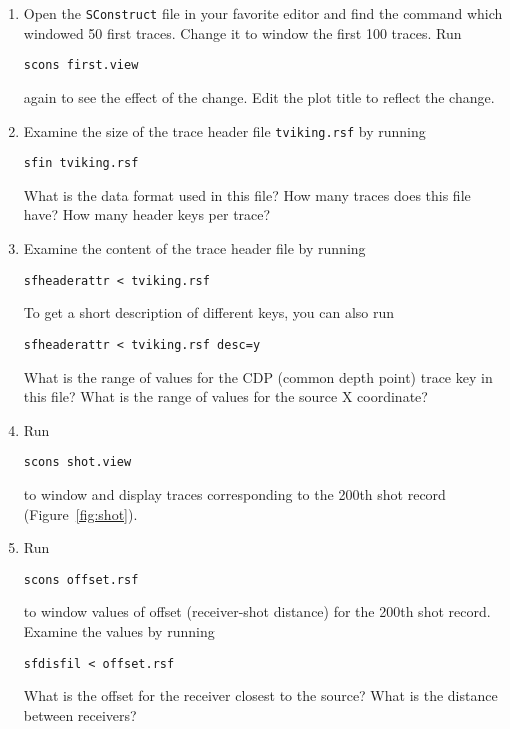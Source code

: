 \begin{enumerate}

\answer{

}

\item Open the \texttt{SConstruct} file in your favorite editor and find the command which windowed 50 first traces. Change it to window the first 100 traces. Run
\begin{verbatim}
scons first.view 
\end{verbatim}
again to see the effect of the change. Edit the plot title to reflect the change.
\item Examine the size of the trace header file \texttt{tviking.rsf} by running
\begin{verbatim}
sfin tviking.rsf
\end{verbatim}
What is the data format used in this file? How many traces does this
file have? How many header keys per trace?

\answer{

}       

\item Examine the content of the trace header file by running
\begin{verbatim}
sfheaderattr < tviking.rsf
\end{verbatim}
To get a short description of different keys, you can also run
\begin{verbatim}
sfheaderattr < tviking.rsf desc=y
\end{verbatim}
What is the range of values for the CDP (common depth point) trace key in this file? What is the range of values for the source X coordinate?

\answer{

}       

\item Run
\begin{verbatim}
scons shot.view
\end{verbatim}
to window and display traces corresponding to the 200th shot record (Figure~\ref{fig:shot}).
\item Run
\begin{verbatim}
scons offset.rsf
\end{verbatim}
to window values of offset (receiver-shot distance) for the 200th shot record. Examine the values by running
\begin{verbatim}
sfdisfil < offset.rsf
\end{verbatim}
What is the offset for the receiver closest to the source? What is the distance between receivers? 


\end{enumerate}
